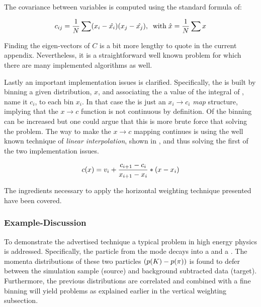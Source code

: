 \noindent The covariance between variables is computed using the standard formula of:

\begin{equation}
\centering
c_{ij} = \frac{1}{N} \sum (x_i-\hat{x_i})(x_j-\hat{x_j}), \;\; \text {with} \; \hat{x} = \frac{1}{N} \sum x
\label{hor_reww_correlation_formula}
\end{equation}

\noindent Finding the eigen-vectors of $C$ is a bit more lengthy to quote in the current appendix.
Nevertheless, it is a straightforward well known problem for which there are many implemented
algorithms as well.

Lastly an important implementation issues is clarified. Specifically, the \cdf is built by binning a
given distribution, $x$, and associating the a value of the integral of , name it $c_i$,
to each bin $x_i$. In that case  the \cdf is just an $x_i \to c_i$ {\it map}
structure, implying that the $x \to c$ function is not continuous by definition. Of the binning can be increased
but one could argue that this is more brute force that solving the problem. The way to make the $x \to c$ mapping
continues is using the well known technique of {\it linear interpolation}, shown in ,
and thus solving the first of the two implementation issues.

\begin{equation}
  c(x) = v_i + \frac{c_{i+1}-c_i}{x_{i+1}-x_i} *  \left( x - x_i \right)
  \label{linear_interpolation}
\end{equation}

The ingredients necessary to apply the horizontal weighting technique presented have been covered.

\subsubsection{Example-Discussion}
To demonstrate the advertised technique a typical problem in high energy physics is addressed.
Specifically, the \Kstarz particle from the \BsJpsiKst mode decays into a \kaon and a \pion. The momenta
distributions of these two particles $\left( \mbox{$p$}(K)-\mbox{$p$}(\pi) \right)$ is found to defer between
the simulation sample (source) and background subtracted data (target).
Furthermore, the previous distributions are correlated and combined with a fine binning will yield problems as explained
earlier in the vertical weighting subsection.

